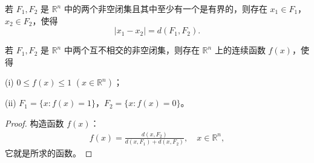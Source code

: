 \documentclass[../../main.tex]{subfiles}
\begin{document}
\begin{corollary}
若 \(F_1,F_2\) 是 \(\mathbb{R}^n\) 中的两个非空闭集且其中至少有一个是有界的，则存在 \(x_1\in F_1\)，\(x_2\in F_2\)，使得
\[
|x_1 - x_2| = d(F_1,F_2).
\] 
\end{corollary}

\begin{lemma}
若 \(F_1,F_2\) 是 \(\mathbb{R}^n\) 中两个互不相交的非空闭集，则存在 \(\mathbb{R}^n\) 上的连续函数 \(f(x)\)，使得

(i) \(0\leqslant f(x)\leqslant 1\) \((x\in\mathbb{R}^n)\)；

(ii) \(F_1 = \{x: f(x) = 1\}\)，\(F_2 = \{x: f(x) = 0\}\)。
\end{lemma}
\begin{proof}
构造函数 \(f(x)\)：
\begin{align*}
f(x)=\frac{d(x,F_2)}{d(x,F_1)+d(x,F_2)}, \quad x\in\mathbb{R}^n,
\end{align*}
它就是所求的函数。 
\end{proof}
\end{document}
